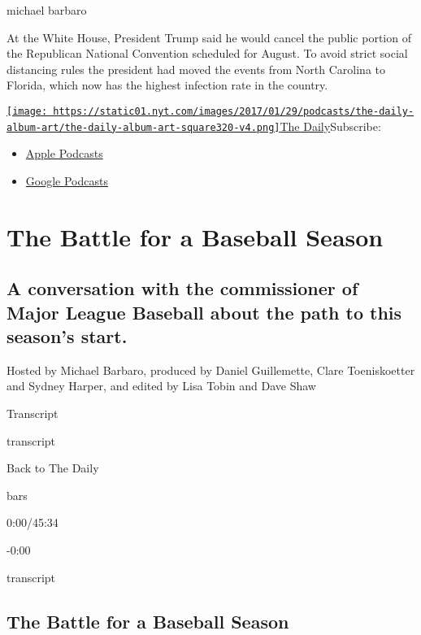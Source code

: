 michael barbaro

At the White House, President Trump said he would cancel the public
portion of the Republican National Convention scheduled for August. To
avoid strict social distancing rules the president had moved the events
from North Carolina to Florida, which now has the highest infection rate
in the country.

\href{https://www.nytimes.com/column/the-daily}{\texttt{[image: https://static01.nyt.com/images/2017/01/29/podcasts/the-daily-album-art/the-daily-album-art-square320-v4.png]}The
Daily}Subscribe:

\begin{itemize}
\tightlist
\item
  \href{https://itunes.apple.com/us/podcast/id1200361736}{Apple
  Podcasts}
\item
  \href{https://www.google.com/podcasts?feed=aHR0cHM6Ly9yc3MuYXJ0MTkuY29tL3RoZS1kYWlseQ\%3D\%3D}{Google
  Podcasts}
\end{itemize}

\hypertarget{the-battle-for-a-baseball-season-1}{%
\section{The Battle for a Baseball
Season}\label{the-battle-for-a-baseball-season-1}}

\hypertarget{a-conversation-with-the-commissioner-of-major-league-baseball-about-the-path-to-this-seasons-start-1}{%
\subsection{A conversation with the commissioner of Major League
Baseball about the path to this season's
start.}\label{a-conversation-with-the-commissioner-of-major-league-baseball-about-the-path-to-this-seasons-start-1}}

Hosted by Michael Barbaro, produced by Daniel Guillemette, Clare
Toeniskoetter and Sydney Harper, and edited by Lisa Tobin and Dave Shaw

Transcript

transcript

Back to The Daily

bars

0:00/45:34

-0:00

transcript

\hypertarget{the-battle-for-a-baseball-season-2}{%
\subsection{The Battle for a Baseball
Season}\label{the-battle-for-a-baseball-season-2}}

